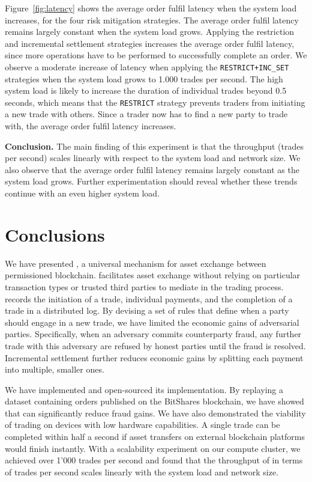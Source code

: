 Figure~\ref{fig:latency} shows the average order fulfil latency when the system load increases, for the four risk mitigation strategies.
The average order fulfil latency remains largely constant when the system load grows.
Applying the restriction and incremental settlement strategies increases the average order fulfil latency, since more operations have to be performed to successfully complete an order.
We observe a moderate increase of latency when applying the \texttt{RESTRICT+INC\_SET} strategies when the system load grows to 1.000 trades per second.
The high system load is likely to increase the duration of individual trades beyond 0.5 seconds, which means that the \texttt{RESTRICT} strategy prevents traders from initiating a new trade with others.
Since a trader now has to find a new party to trade with, the average order fulfil latency increases.

\textbf{Conclusion.}
The main finding of this experiment is that the throughput (trades per second) scales linearly with respect to the system load and network size.
We also observe that the average order fulfil latency remains largely constant as the system load grows.
Further experimentation should reveal whether these trends continue with an even higher system load.

\section{Conclusions}
We have presented \ModelName{}, a universal mechanism for asset exchange between permissioned blockchain.
\ModelName{} facilitates asset exchange without relying on particular transaction types or trusted third parties to mediate in the trading process.
\ModelName{} records the initiation of a trade, individual payments, and the completion of a trade in a distributed log.
By devising a set of rules that define when a party should engage in a new trade, we have limited the economic gains of adversarial parties.
Specifically, when an adversary commits counterparty fraud, any further trade with this adversary are refused by honest parties until the fraud is resolved.
Incremental settlement further reduces economic gains by splitting each payment into multiple, smaller ones.

We have implemented \ModelName{} and open-sourced its implementation.
By replaying a dataset containing orders published on the BitShares blockchain, we have showed that \ModelName{} can significantly reduce fraud gains.
We have also demonstrated the viability of trading on devices with low hardware capabilities.
A single trade can be completed within half a second if asset transfers on external blockchain platforms would finish instantly.
With a scalability experiment on our compute cluster, we achieved over 1'000 trades per second and found that the throughput of \ModelName{} in terms of trades per second scales linearly with the system load and network size.

